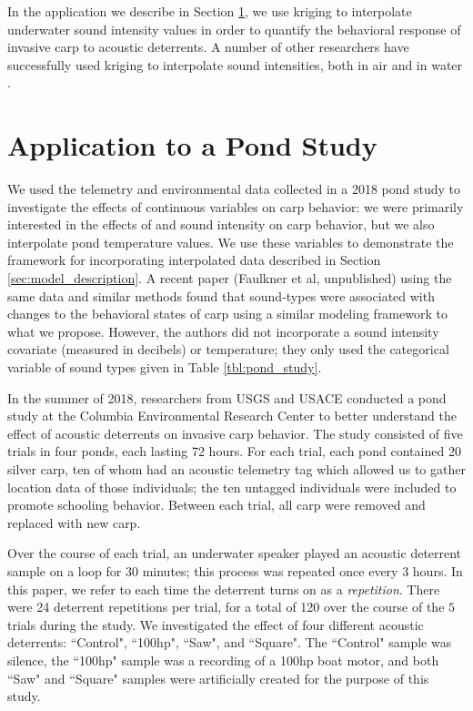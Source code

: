 \documentclass[12pt]{article}
\begin{document}
	In the application we describe in Section \ref{sec:pond-study}, we use kriging to interpolate underwater sound intensity values in order to quantify the behavioral response of invasive carp to acoustic deterrents. A number of other researchers have successfully used kriging to interpolate sound intensities, both in air \cite{Baume2008, Bostanci2018} and in water \cite{Sun2018}.
	
	\section{Application to a Pond Study} \label{sec:pond-study}
	
	We used the telemetry and environmental data collected in a 2018 pond study to investigate the effects of continuous variables on carp behavior: we were primarily interested in the effects of and sound intensity on carp behavior, but we also interpolate pond temperature values. We use these variables to demonstrate the framework for incorporating interpolated data described in Section \ref{sec:model_description}. A recent paper (Faulkner et al, unpublished) using the same data and similar methods found that sound-types were associated with changes to the behavioral states of carp using a similar modeling framework to what we propose. However, the authors did not incorporate a sound intensity covariate (measured in decibels) or temperature; they only used the categorical variable of sound types given in Table \ref{tbl:pond_study}.
	
	In the summer of 2018, researchers from USGS and USACE conducted a pond study at the Columbia Environmental Research Center to better understand the effect of acoustic deterrents on invasive carp behavior. The study consisted of five trials in four ponds, each lasting 72 hours. For each trial, each pond contained 20 silver carp, ten of whom had an acoustic telemetry tag which allowed us to gather location data of those individuals; the ten untagged individuals were included to promote schooling behavior. Between each trial, all carp were removed and replaced with new carp.
	
	Over the course of each trial, an underwater speaker played an acoustic deterrent sample on a loop for 30 minutes; this process was repeated once every 3 hours. In this paper, we refer to each time the deterrent turns on as a \emph{repetition}. There were 24 deterrent repetitions per trial, for a total of 120 over the course of the $5$ trials during the study. We investigated the effect of four different acoustic deterrents: ``Control", ``100hp", ``Saw", and ``Square". The ``Control" sample was silence, the ``100hp" sample was a recording of a 100hp boat motor, and both ``Saw" and ``Square" samples were artificially created for the purpose of this study.
	
\end{document}
